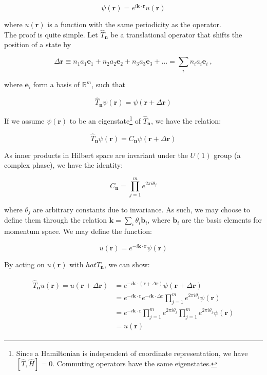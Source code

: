 \documentclass[10pt]{report}
\begin{document}
	\begin{equation}
		\psi(\bm{r}) = e^{i\bm{k}\cdot\bm{r}}u(\bm{r})
	\end{equation}
	
	where $u(\bm{r})$ is a function with the same periodicity as the operator.\\
	
	The proof is quite simple. Let $\hat{T}_{\bm{n}}$ be a translational operator that shifts the position of a state by
	
	$$
	\Delta \bm{r} \equiv n_1a_1\bm{e}_1 + n_2a_2\bm{e}_2 + n_3a_3\bm{e}_3 + \ldots = \sum_in_ia_i\bm{e}_i\:,
	$$
	
	where $\bm{e}_i$ form a basis of $\mathbb{R}^m$, such that
	
	\begin{equation}
		\hat{T}_{\bm{n}}\psi(\bm{r}) = \psi(\bm{r}+\Delta \bm{r})
	\end{equation}
	
	If we assume $\psi(\bm{r})$ to be an eigenstate\footnote{Since a Hamiltonian is independent of coordinate representation, we have $[\hat{T},\hat{H}] = 0$. Commuting operators have the same eigenstates.} of $\hat{T}_{\bm{n}}$, we have the relation:
	
	\begin{equation}
		\hat{T}_{\bm{n}}\psi(\bm{r}) = C_{\bm{n}}\psi(\bm{r}+\Delta\bm{r})
	\end{equation}
	
	As inner products in Hilbert space are invariant under the $U(1)$ group (a complex phase), we have the identity:
	
	\begin{equation}
		C_{\bm{n}} = \prod_{j=1}^me^{2\pi i\theta_j}
	\end{equation}
	
	where $\theta_j$ are arbitrary constants due to invariance. As such, we may choose to define them through the relation $\bm{k} = \sum_i \theta_i\bm{b}_i$, where $\bm{b}_i$ are the basis elements for momentum space. We may define the function:
	
	\begin{equation}
		u(\bm{r}) = e^{-i\bm{k}\cdot\bm{r}}\psi(\bm{r})
	\end{equation}
	
	By acting on $u(\bm{r})$ with $hat{T}_{\bm{n}}$, we can show:
	
	\begin{align}
		\begin{split}
			\hat{T}_{\bm{n}}u(\bm{r}) = u(\bm{r} + \Delta\bm{r}) &= e^{-i\bm{k}\cdot(\bm{r}+\Delta\bm{r})}\psi(\bm{r}+\Delta\bm{r})\\
			&= e^{-i\bm{k}\cdot\bm{r}}e^{-i\bm{k}\cdot\Delta\bm{r}}\prod_{j=1}^me^{2\pi i\theta_j}\psi(\bm{r})\\
			&= e^{-i\bm{k}\cdot\bm{r}}\prod_{j=1}^me^{2\pi i\theta_j}\prod_{j=1}^me^{2\pi i\theta_j}\psi(\bm{r})\\
			&= u(\bm{r})
		\end{split}
	\end{align}
	
\end{document}
